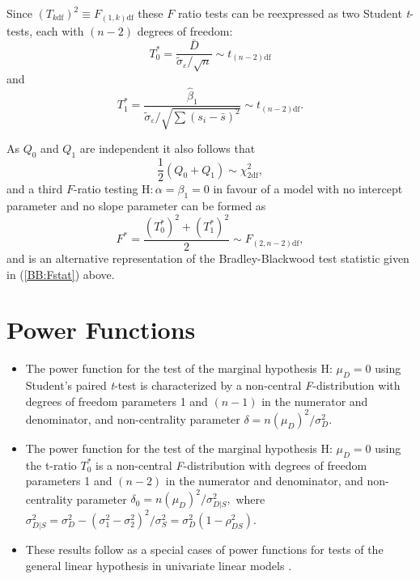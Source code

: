 \documentclass[a4]{beamer}
\begin{document}
\begin{frame}
Since $(T_{k\textrm{df}})^2 \equiv F_{(1,k)\textrm{df}}$ these $F$ ratio tests can be reexpressed as two Student \textit{t}-tests, each with $(n-2)$ degrees of freedom:
\begin{equation}
\label{tZero}
T_0^\ast = \frac{ \bar{D} }{ \tilde{\sigma}_\varepsilon / \sqrt{n}} \sim t_{(n-2)\textrm{df}}
\end{equation}
and
\begin{equation}
\label{tOne}
T_1^\ast = \frac{ \hat\beta_1 }{ \tilde{\sigma}_\varepsilon / \sqrt{\sum{(s_i-\bar{s})^2}}} \sim t_{(n-2)\textrm{df}}.
\end{equation}
\end{frame}

\begin{frame}
As $Q_0$ and $Q_1$ are independent it also follows that
\[
\frac{1}{2}(Q_0 + Q_1) \sim \chi^2_{2\mathrm{df}},
\]
and a third $F$-ratio testing $\textrm{H}\colon \alpha = \beta_1 = 0$ in favour of a model with no intercept parameter and no slope parameter can be formed as
\begin{equation} \label{BBHayes}
F^\ast = \frac{ (T_0^\ast)^2 + (T_1^\ast)^2 }{2} \sim F_{(2,n-2)\textrm{df}} ,
\end{equation}
and is an alternative representation of the Bradley-Blackwood test statistic given in (\ref{BB:Fstat}) above.
\end{frame}

\section{Power Functions}

\begin{frame}
\begin{itemize}
\item The power function for the test of the marginal hypothesis H: $\mu_D=0$ using Student's paired {\it t}-test is characterized by a non-central {\it F}-distribution with degrees of freedom parameters 1 and $(n-1)$ in the numerator and denominator, and non-centrality parameter $\delta = n(\mu_D)^2 / \sigma^2_D.$
\item<2-> The power function for the test of the marginal hypothesis H: $\mu_D=0$ using the t-ratio $T_0^\ast$ is a non-central {\it
F}-distribution with degrees of freedom parameters 1 and $(n-2)$ in the numerator and denominator, and non-centrality parameter $\delta_0 = n(\mu_D)^2 / \sigma^2_{D|S},$ where $\sigma^2_{D|S} = \sigma^2_D - (\sigma^2_1-\sigma^2_2 )^2/ \sigma^2_S=\sigma^2_D(1-\rho_{DS}^2).$
\item<3-> These results follow as a special cases of power functions for tests of the general linear hypothesis in univariate linear models \citep{OBrienMuller}.
\end{itemize}
\end{frame}
\end{document}
